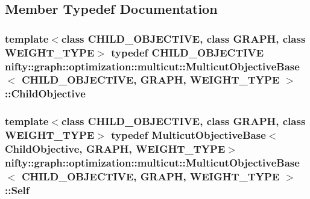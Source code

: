 \subsection{Member Typedef Documentation}
\hypertarget{classnifty_1_1graph_1_1optimization_1_1multicut_1_1MulticutObjectiveBase_a256253bb4f2d9c3ebabd67a4b7941ffd}{}
\subsubsection[{Child\+Objective}]{\setlength{\rightskip}{0pt plus 5cm}template$<$class C\+H\+I\+L\+D\+\_\+\+O\+B\+J\+E\+C\+T\+I\+V\+E, class G\+R\+A\+P\+H, class W\+E\+I\+G\+H\+T\+\_\+\+T\+Y\+P\+E$>$ typedef C\+H\+I\+L\+D\+\_\+\+O\+B\+J\+E\+C\+T\+I\+V\+E {\bf nifty\+::graph\+::optimization\+::multicut\+::\+Multicut\+Objective\+Base}$<$ C\+H\+I\+L\+D\+\_\+\+O\+B\+J\+E\+C\+T\+I\+V\+E, G\+R\+A\+P\+H, W\+E\+I\+G\+H\+T\+\_\+\+T\+Y\+P\+E $>$\+::{\bf Child\+Objective}}\label{classnifty_1_1graph_1_1optimization_1_1multicut_1_1MulticutObjectiveBase_a256253bb4f2d9c3ebabd67a4b7941ffd}
\hypertarget{classnifty_1_1graph_1_1optimization_1_1multicut_1_1MulticutObjectiveBase_a7238b3aeca9c11540455f19509f1ee66}{}
\subsubsection[{Self}]{\setlength{\rightskip}{0pt plus 5cm}template$<$class C\+H\+I\+L\+D\+\_\+\+O\+B\+J\+E\+C\+T\+I\+V\+E, class G\+R\+A\+P\+H, class W\+E\+I\+G\+H\+T\+\_\+\+T\+Y\+P\+E$>$ typedef {\bf Multicut\+Objective\+Base}$<${\bf Child\+Objective}, G\+R\+A\+P\+H, W\+E\+I\+G\+H\+T\+\_\+\+T\+Y\+P\+E$>$ {\bf nifty\+::graph\+::optimization\+::multicut\+::\+Multicut\+Objective\+Base}$<$ C\+H\+I\+L\+D\+\_\+\+O\+B\+J\+E\+C\+T\+I\+V\+E, G\+R\+A\+P\+H, W\+E\+I\+G\+H\+T\+\_\+\+T\+Y\+P\+E $>$\+::{\bf Self}}\label{classnifty_1_1graph_1_1optimization_1_1multicut_1_1MulticutObjectiveBase_a7238b3aeca9c11540455f19509f1ee66}


